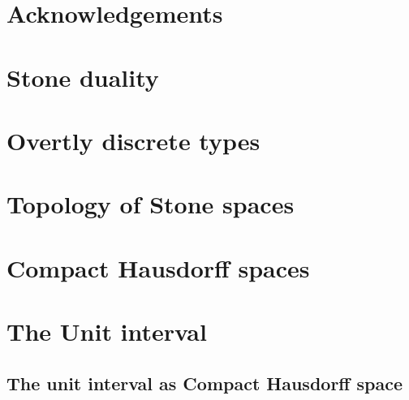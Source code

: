 \documentclass{../util/zariski}
\begin{document}
\section*{Acknowledgements}




\section{Stone duality}



\section{Overtly discrete types}

%
%





\section{Topology of Stone spaces}





\section{Compact Hausdorff spaces}




\section{The Unit interval}
\subsection{The unit interval as Compact Hausdorff space}


 
\end{document}

